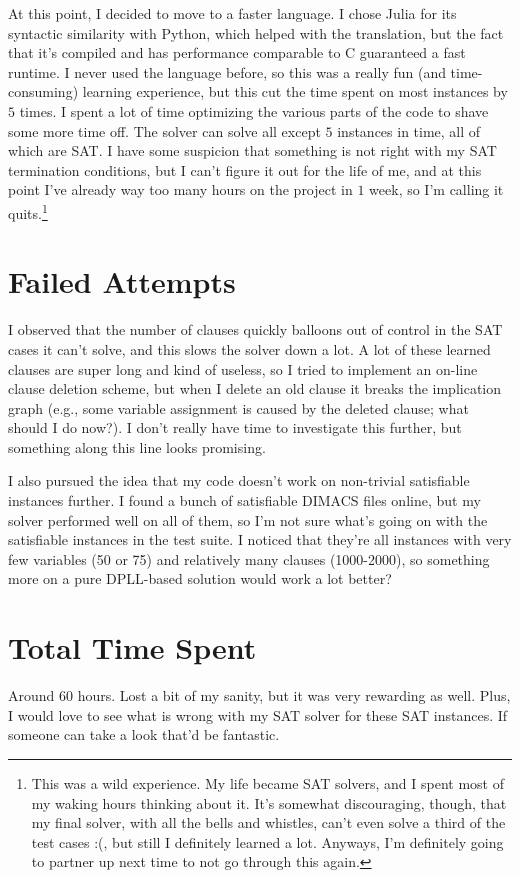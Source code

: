 \documentclass[10pt]{article}
\theoremstyle{definition} %
\begin{document}
At this point, I decided to move to a faster language. I chose Julia for its syntactic similarity with Python, which helped with the translation, but the fact that it's compiled and has performance comparable to C guaranteed a fast runtime. I never used the language before, so this was a really fun (and time-consuming) learning experience, but this cut the time spent on most instances by $5$ times. I spent a lot of time optimizing the various parts of the code to shave some more time off. The solver can solve all except $5$ instances in time, all of which are SAT. I have some suspicion that something is not right with my SAT termination conditions, but I can't figure it out for the life of me, and at this point I've already way too many hours on the project in $1$ week, so I'm calling it quits.\footnote{This was a wild experience. My life became SAT solvers, and I spent most of my waking hours thinking about it. It's somewhat discouraging, though, that my final solver, with all the bells and whistles, can't even solve a third of the test cases :(, but still I definitely learned a lot. Anyways, I'm definitely going to partner up next time to not go through this again. }

\section{Failed Attempts}

I observed that the number of clauses quickly balloons out of control in the SAT cases it can't solve, and this slows the solver down a lot. A lot of these learned clauses are super long and kind of useless, so I tried to implement an on-line clause deletion scheme, but when I delete an old clause it breaks the implication graph (e.g., some variable assignment is caused by the deleted clause; what should I do now?). I don't really have time to investigate this further, but something along this line looks promising. 

I also pursued the idea that my code doesn't work on non-trivial satisfiable instances further. I found a bunch of satisfiable DIMACS files online, but my solver performed well on all of them, so I'm not sure what's going on with the satisfiable instances in the test suite. I noticed that they're all instances with very few variables (50 or 75) and relatively many clauses (1000-2000), so something more on a pure DPLL-based solution would work a lot better? 

\section{Total Time Spent}
Around 60 hours. Lost a bit of my sanity, but it was very rewarding as well. Plus, I would love to see what is wrong with my SAT solver for these SAT instances. If someone can take a look that'd be fantastic. 
\end{document}
